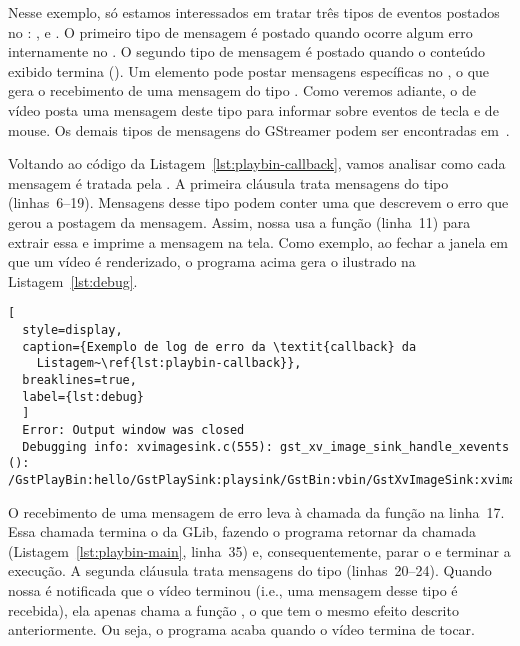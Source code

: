 Nesse exemplo, só estamos interessados em tratar três tipos de eventos postados
no :
,  e .
O primeiro tipo de mensagem é postado quando ocorre algum erro internamente
no . O segundo tipo de mensagem é postado quando o conteúdo 
exibido termina (). Um elemento pode postar mensagens 
específicas no , o que gera o recebimento de 
uma mensagem do tipo . Como veremos adiante,
o  de vídeo posta uma mensagem deste tipo para informar sobre eventos
de tecla e de mouse. Os demais tipos de mensagens do GStreamer podem ser
encontradas em~\cite{gstreamer}.

Voltando ao código da Listagem~\ref{lst:playbin-callback}, vamos analisar como
cada mensagem é tratada pela  . A primeira
cláusula  trata mensagens do tipo  (linhas~6--19).
Mensagens desse tipo podem conter uma  que descrevem o erro que
gerou a postagem da mensagem. Assim, nossa  usa a função 
 (linha~11) para extrair essa  e 
imprime a mensagem na tela. Como exemplo, ao fechar a janela em que um vídeo é 
renderizado, o programa acima gera o  ilustrado na 
Listagem~\ref{lst:debug}. 

\begin{lstlisting}[
  style=display,
  caption={Exemplo de log de erro da \textit{callback} da 
    Listagem~\ref{lst:playbin-callback}},
  breaklines=true,
  label={lst:debug}
  ]
  Error: Output window was closed
  Debugging info: xvimagesink.c(555): gst_xv_image_sink_handle_xevents (): /GstPlayBin:hello/GstPlaySink:playsink/GstBin:vbin/GstXvImageSink:xvimagesink0
\end{lstlisting}

O recebimento de uma mensagem de erro leva à chamada da função 
 na linha~17. Essa chamada termina o  da GLib, 
fazendo o programa retornar da chamada  
(Listagem~\ref{lst:playbin-main}, linha~35) e, consequentemente, parar o
 e terminar a execução. A segunda cláusula  trata 
mensagens do tipo  (linhas~20--24). Quando nossa
 é notificada que o vídeo terminou (i.e., uma mensagem desse tipo é
recebida), ela apenas chama a função , o que tem o mesmo
efeito descrito anteriormente. Ou seja, o programa acaba quando o vídeo termina
de tocar.

